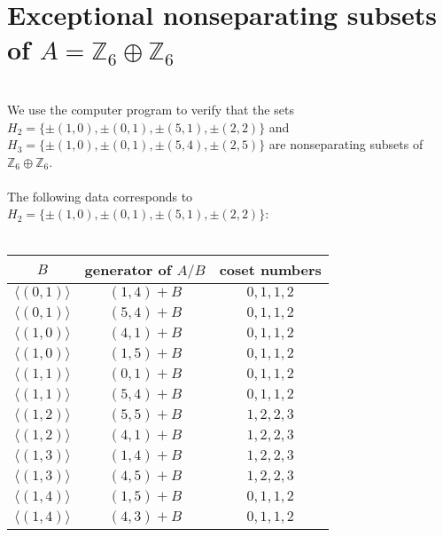 \documentclass[article,dvisp]{amsart}
\def\Z{\mathbb{Z}}
\theoremstyle{definition}
\theoremstyle{remark}
\numberwithin{equation}{section}
\theoremstyle{lemma}
\begin{document}
\section{Exceptional nonseparating subsets of $A=\Z_{6}\oplus\Z_{6}$}\
\\
We use the computer program to verify that the sets $H_{2}=\{\pm(1,0),\pm(0,1),\pm(5,1),\pm(2,2)\}$ and $H_{3}=\{\pm(1,0),\pm(0,1),\pm(5,4),\pm(2,5)\}$ are nonseparating subsets of $\Z_{6}\oplus\Z_{6}$.\\
\\
The following data corresponds to $H_{2}=\{\pm(1,0),\pm(0,1),\pm(5,1),\pm(2,2)\}$:\\
\\
\begin{tabular}{|c|c|c|}
\hline
$B$&generator of $A/B$&coset numbers\\
\hline
$\langle(0,1)\rangle$&$(1,4)+B$&$0,1,1,2$\\
\hline
$\langle(0,1)\rangle$&$(5,4)+B$&$0,1,1,2$\\
\hline
$\langle(1,0)\rangle$&$(4,1)+B$&$0,1,1,2$\\
\hline
$\langle(1,0)\rangle$&$(1,5)+B$&$0,1,1,2$\\
\hline
$\langle(1,1)\rangle$&$(0,1)+B$&$0,1,1,2$\\
\hline
$\langle(1,1)\rangle$&$(5,4)+B$&$0,1,1,2$\\
\hline
$\langle(1,2)\rangle$&$(5,5)+B$&$1,2,2,3$\\
\hline
$\langle(1,2)\rangle$&$(4,1)+B$&$1,2,2,3$\\
\hline
$\langle(1,3)\rangle$&$(1,4)+B$&$1,2,2,3$\\
\hline
$\langle(1,3)\rangle$&$(4,5)+B$&$1,2,2,3$\\
\hline
$\langle(1,4)\rangle$&$(1,5)+B$&$0,1,1,2$\\
\hline
$\langle(1,4)\rangle$&$(4,3)+B$&$0,1,1,2$\\
\hline
\end{tabular}
\quad
\end{document}
